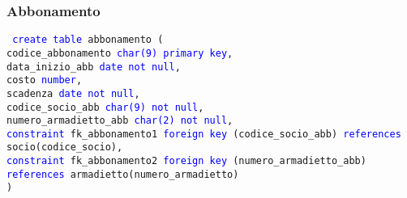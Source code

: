 \documentclass{article}
\begin{document}
    \subsubsection{Abbonamento}
    \begin{flushleft}
        \texttt{
        \textcolor{blue}{create table} abbonamento ( \\
        \hspace*{2em} codice\_abbonamento \hspace*{1.7em} \textcolor{blue}{char(9)} \hspace*{4em} \textcolor{blue}{primary key}, \\
        \hspace*{2em} data\_inizio\_abb \hspace*{3.4em} \textcolor{blue}{date} \hspace*{5.4em} \textcolor{blue}{not null}, \\
        \hspace*{2em} costo \hspace*{8.1em} \textcolor{blue}{number}, \\
        \hspace*{2em} scadenza \hspace*{6.6em} \textcolor{blue}{date} \hspace*{5.4em} \textcolor{blue}{not null}, \\
        \hspace*{2em} codice\_socio\_abb \hspace*{2.8em} \textcolor{blue}{char(9)} \hspace*{4.1em} \textcolor{blue}{not null}, \\
        \hspace*{2em} numero\_armadietto\_abb \hspace*{0.3em} \textcolor{blue}{char(2)} \hspace*{4.1em} \textcolor{blue}{not null}, \\
        \hspace*{2em} \textcolor{blue}{constraint} fk\_abbonamento1 \textcolor{blue}{foreign key} (codice\_socio\_abb) \textcolor{blue}{references} \hspace*{2em} socio(codice\_socio), \\
        \hspace*{2em} \textcolor{blue}{constraint} fk\_abbonamento2 \textcolor{blue}{foreign key} (numero\_armadietto\_abb) \textcolor{blue}{references} \hspace*{2em} armadietto(numero\_armadietto) \\)}
    \end{flushleft}
\end{document}
